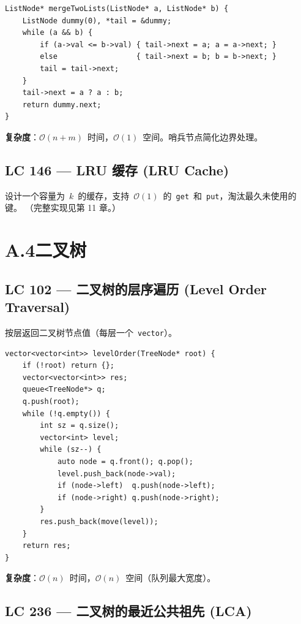 \documentclass[12pt,a4paper,fontset=fandol]{ctexbook}
\newcommand{\bigO}[1]{\mathcal{O}(#1)}
\newcommand{\Tp}[1]{\texttt{#1}}
\begin{document}
\begin{lstlisting}[style=cppstyle]
ListNode* mergeTwoLists(ListNode* a, ListNode* b) {
    ListNode dummy(0), *tail = &dummy;
    while (a && b) {
        if (a->val <= b->val) { tail->next = a; a = a->next; }
        else                  { tail->next = b; b = b->next; }
        tail = tail->next;
    }
    tail->next = a ? a : b;
    return dummy.next;
}
\end{lstlisting}
\textbf{复杂度}：$\bigO{n+m}$~时间，$\bigO{1}$~空间。哨兵节点简化边界处理。

\subsection*{LC 146 — LRU 缓存 (LRU Cache)}

设计一个容量为~$k$~的缓存，支持~$\bigO{1}$~的~\texttt{get}~和~\texttt{put}，淘汰最久未使用的键。
（完整实现见第 11 章。）

\section*{A.4\quad 二叉树}

\subsection*{LC 102 — 二叉树的层序遍历 (Level Order Traversal)}

按层返回二叉树节点值（每层一个~\Tp{vector}）。

\begin{lstlisting}[style=cppstyle]
vector<vector<int>> levelOrder(TreeNode* root) {
    if (!root) return {};
    vector<vector<int>> res;
    queue<TreeNode*> q;
    q.push(root);
    while (!q.empty()) {
        int sz = q.size();
        vector<int> level;
        while (sz--) {
            auto node = q.front(); q.pop();
            level.push_back(node->val);
            if (node->left)  q.push(node->left);
            if (node->right) q.push(node->right);
        }
        res.push_back(move(level));
    }
    return res;
}
\end{lstlisting}
\textbf{复杂度}：$\bigO{n}$~时间，$\bigO{n}$~空间（队列最大宽度）。

\subsection*{LC 236 — 二叉树的最近公共祖先 (LCA)}
\end{document}
